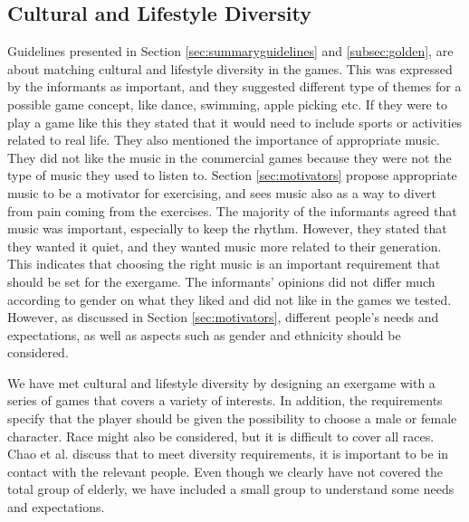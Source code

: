 \subsection{Cultural and Lifestyle Diversity}
Guidelines presented in Section \ref{sec:summaryguidelines} and \ref{subsec:golden}, are about matching cultural and lifestyle diversity in the games. This was expressed by the informants as important, and they suggested different type of themes for a possible game concept, like dance, swimming, apple picking etc. If they were to play a game like this they stated that it would need to include sports or activities related to real life. They also mentioned the importance of appropriate music. They did not like the music in the commercial games because they were not the type of music they used to listen to. Section \ref{sec:motivators} propose appropriate music to be a motivator for exercising, and \cite{schutzer} sees music also as a way to divert from pain coming from the exercises. The majority of the informants agreed that music was important, especially to keep the rhythm. However, they stated that they wanted it quiet, and they wanted music more related to their generation. This indicates that choosing the right music is an important requirement that should be set for the exergame. The informants' opinions did not differ much according to gender on what they liked and did not like in the games we tested. However, as discussed in Section \ref{sec:motivators}, different people's needs and expectations, as well as aspects such as gender and ethnicity should be considered. 

We have met cultural and lifestyle diversity by designing an exergame with a series of games that covers a variety of interests. In addition, the requirements specify that the player should be given the possibility to choose a male or female character. Race might also be considered, but it is difficult to cover all races. Chao et al. \cite{chao} discuss that to meet diversity requirements, it is important to be in contact with the relevant people. Even though we clearly have not covered the total group of elderly, we have included a small group to understand some needs and expectations.

